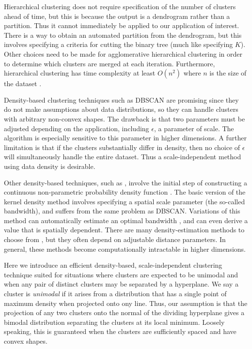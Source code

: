 \documentclass[10pt]{article}
\begin{document}
Hierarchical clustering \citep[Ch.~14]{zaki-book} does not require specification of the number of clusters ahead of time, but this is because the output is a dendrogram rather than a partition. Thus it cannot immediately be applied to our application of interest. There is a way to obtain an automated partition from the dendrogram, but this involves specifying a criteria for cutting the binary tree (much like specifying $K$). Other choices need to be made for agglomerative hierarchical clustering in order to determine which clusters are merged at each iteration. Furthermore, hierarchical clustering has time complexity at least $O(n^2)$ where $n$ is the size of the dataset \citep[Sec.~14.2.3]{zaki-book}.

Density-based clustering techniques such as DBSCAN \citep{dbscan} are promising since they do not make assumptions about
data distributions, %
so they can handle clusters with arbitrary non-convex shapes. The drawback is that two parameters must be adjusted depending on the application, including $\epsilon$, a parameter of scale. The algorithm is especially sensitive to this parameter in higher dimensions. A further limitation is that if the clusters
substantially differ in density, then no choice of $\epsilon$ will simultaneously handle the entire dataset. Thus a scale-independent method using data density is desirable.

Other density-based techniques, such as \citep{mean-shift}, involve the initial step of constructing a continuous non-parametric probability density function \citep[Ch.~15]{zaki-book}. The basic version of the kernel density method \citep{kernel-density-function-1,kernel-density-function-2} involves specifying a spatial scale parameter (the so-called bandwidth), and suffers from the same problem as DBSCAN. Variations of this method can automatically estimate an optimal bandwidth \citep{silverman-density-estimation}, and can even derive a value that is spatially dependent. There are many density-estimation methods to choose from \citep[incluuding][]{rodriguez-clustering}, but they often depend on adjustable distance parameters.
In general, these methods become computationally intractable in higher dimensions.

Here we introduce an efficient density-based, scale-independent clustering technique suited for situations where clusters are expected to be unimodal and when any pair of distinct clusters may be separated by a hyperplane. We say a cluster is {\em unimodal} if it arises from a distribution that has a single point of maximum density when projected onto ony line. Thus, our assumption is that the projection of any two clusters onto the normal of the dividing hyperplane gives a bimodal distribution separating the clusters at its local minimum. Loosely speaking, this is guaranteed when the clusters are sufficiently spaced and have convex shapes.
\end{document}
